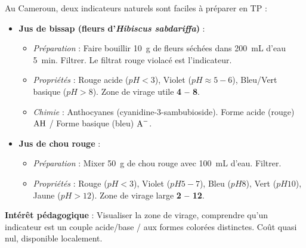 \documentclass[11pt]{article}
\begin{document}
\begin{savaistu}
Au Cameroun, deux indicateurs naturels sont faciles à préparer en TP :
\begin{itemize}
  \item \textbf{Jus de bissap (fleurs d'\emph{Hibiscus sabdariffa})} : 
  \begin{itemize}
    \item \textit{Préparation} : Faire bouillir \SI{10}{g} de fleurs séchées dans \SI{200}{mL} d'eau \SI{5}{min}. Filtrer. Le filtrat rouge violacé est l'indicateur.
    \item \textit{Propriétés} : Rouge acide ($pH < 3$), Violet ($pH \approx 5-6$), Bleu/Vert basique ($pH > 8$). Zone de virage utile \textbf{4 -- 8}.
    \item \textit{Chimie} : Anthocyanes (cyanidine-3-sambubioside). Forme acide (rouge) $\ce{AH}$ / Forme basique (bleu) $\ce{A-}$.
  \end{itemize}
  \item \textbf{Jus de chou rouge} : 
  \begin{itemize}
    \item \textit{Préparation} : Mixer \SI{50}{g} de chou rouge avec \SI{100}{mL} d'eau. Filtrer.
    \item \textit{Propriétés} : Rouge ($pH < 3$), Violet ($pH 5-7$), Bleu ($pH 8$), Vert ($pH 10$), Jaune ($pH > 12$). Zone de virage large \textbf{2 -- 12}.
  \end{itemize}
\end{itemize}
\textbf{Intérêt pédagogique} : Visualiser la zone de virage, comprendre qu'un indicateur est un couple acide/base / aux formes colorées distinctes. Coût quasi nul, disponible localement.
\end{savaistu}
\end{document}
